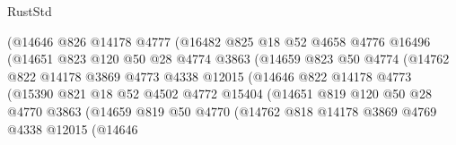 \begin{lexlean}{RustStd}
\begin{coremodule}
                            (@14646
                              @826
                              @14178
                              @4777
                              (@16482
                                @825
                                @18
                                @52
                                @4658
                                @4776
                                @16496
                                (@14651
                                  @823
                                  @120
                                  @50
                                  @28
                                  @4774
                                  @3863
                                  (@14659
                                    @823
                                    @50
                                    @4774
                                    (@14762
                                      @822
                                      @14178
                                      @3869
                                      @4773
                                      @4338
                                      @12015
                                      (@14646
                                        @822
                                        @14178
                                        @4773
                                        (@15390
                                          @821
                                          @18
                                          @52
                                          @4502
                                          @4772
                                          @15404
                                          (@14651
                                            @819
                                            @120
                                            @50
                                            @28
                                            @4770
                                            @3863
                                            (@14659
                                              @819
                                              @50
                                              @4770
                                              (@14762
                                                @818
                                                @14178
                                                @3869
                                                @4769
                                                @4338
                                                @12015
                                                (@14646

\end{coremodule}
\end{lexlean}
